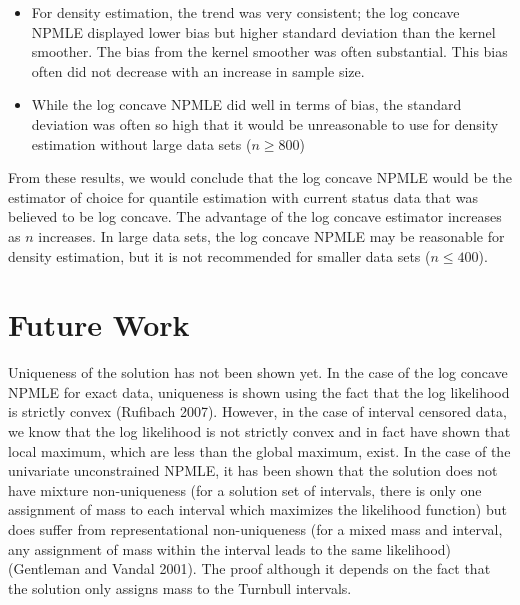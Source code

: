 \documentclass[10pt]{article}
\begin{document}
\begin{itemize}
	\item For density estimation, the trend was very consistent; the log concave NPMLE displayed lower bias but higher standard deviation than the kernel smoother. The bias from the kernel smoother was often substantial. This bias often did not decrease with an increase in sample size. 
	
	\item While the log concave NPMLE did well in terms of bias, the standard deviation was often so high that it would be unreasonable to use for density estimation without large data sets ($n \geq 800$) 

\end{itemize}	

	From these results, we would conclude that the log concave NPMLE would be the estimator of choice for quantile estimation with current status data that was believed to be log concave. The advantage of the log concave estimator increases as $n$ increases. In large data sets, the log concave NPMLE may be reasonable for density estimation, but it is not recommended for smaller data sets ($n \leq 400$).
	
	{\section{Future Work} } 

	Uniqueness of the solution has not been shown yet. In the case of the log concave NPMLE for exact data, uniqueness is shown using the fact that the log likelihood is strictly convex (Rufibach 2007). However, in the case of interval censored data, we know that the log likelihood is not strictly convex and in fact have shown that local maximum, which are less than the global maximum, exist. In the case of the univariate unconstrained NPMLE, it has been shown that the solution does not have mixture non-uniqueness (for a solution set of intervals, there is only one assignment of mass to each interval which maximizes the likelihood function) but does suffer from representational non-uniqueness (for a mixed mass and interval, any assignment of mass within the interval leads to the same likelihood) (Gentleman and Vandal 2001). The proof although it depends on the fact that the solution only assigns mass to the Turnbull intervals. 
	
\end{document}
